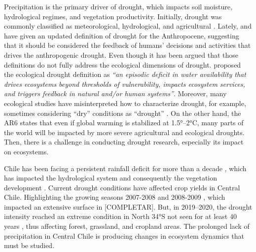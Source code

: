 \documentclass[
  number,
  preprint,
  3p]{elsarticle}
\begin{document}
Precipitation is the primary driver of drought, which impacts soil
moisture, hydrological regimes, and vegetation productivity. Initially,
drought was commonly classified as meteorological, hydrological, and
agricultural \citep{Wilhite1985}. Lately, \citep{Loon2016} and
\citep{AghaKouchak2021} have given an updated definition of drought for
the Anthropocene, suggesting that it should be considered the feedback
of humans' decisions and activities that drives the anthropogenic
drought. Even though it has been argued that those definitions do not
fully address the ecological dimensions of drought. \citep{Crausbay2017}
proposed the ecological drought definition as \emph{``an episodic
deficit in water availability that drives ecosystems beyond thresholds
of vulnerability, impacts ecosystem services, and triggers feedback in
natural and/or human systems''}. Moreover, many ecological studies have
misinterpreted how to characterize drought, for example, sometimes
considering ``dry'' conditions as ``drought'' \citep{Slette2019}. On the
other hand, the AR6 \citep{IPCC2023} states that even if global warming
is stabilized at 1.5°--2°C, many parts of the world will be impacted by
more severe agricultural and ecological droughts. Then, there is a
challenge in conducting drought research, especially its impact on
ecosystems.

Chile has been facing a persistent rainfall deficit for more than a
decade \citep{Garreaud2017}, which has impacted the hydrological system
\citep{Boisier2018} and consequently the vegetation development
\citep{Zambrano2023}. Current drought conditions have affected crop
yields in Central Chile. Highlighting the growing seasons 2007-2008 and
2008-2009 \citep[\citep{Zambrano2018}]{Zambrano2016}, which impacted an
extensive surface in {[}COMPLETAR{]}. But, in 2019--2020, the drought
intensity reached an extreme condition in North 34°S not seen for at
least 40 years \citep{Zambrano2023}, thus affecting forest, grassland,
and cropland areas. The prolonged lack of precipitation in Central Chile
is producing changes in ecosystem dynamics that must be studied.
\end{document}
